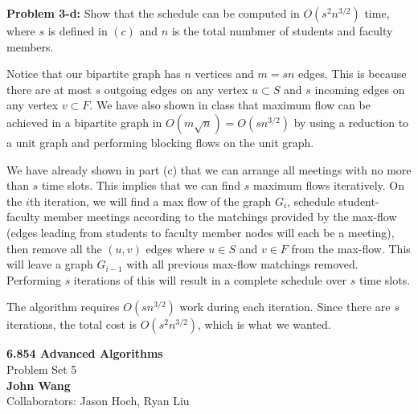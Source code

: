 \documentclass[psamsfonts]{amsart}
\newenvironment{sol}{\vspace{0.25cm}{\large \bfseries Solution:}}{\qedsymbol}
\newenvironment{prob}[1]{\begin{framed}{\large \bfseries Problem #1:}}{\end{framed}}
\newcommand{\makenewtitle}{
    \begin{center}
    {\huge \bfseries 6.854 Advanced Algorithms} \\
    Problem Set 5\\
    \vspace{0.25cm}
    {\bfseries John Wang} \\
    Collaborators: Jason Hoch, Ryan Liu
    \end{center}
    \vspace{0.5cm}
}
\begin{document}
\begin{prob}{3-d}
Show that the schedule can be computed in $O(s^2 n^{3/2})$ time, where $s$ is defined in $(c)$ and $n$ is the total numbmer of students and faculty members.
\end{prob}
\begin{sol}
Notice that our bipartite graph has $n$ vertices and $m = sn$ edges. This is because there are at most $s$ outgoing edges on any vertex $u \subset S$ and $s$ incoming edges on any vertex $v \subset F$. We have also shown in class that maximum flow can be achieved in a bipartite graph in $O(m \sqrt{n}) = O(s n^{3/2})$ by using a reduction to a unit graph and performing blocking flows on the unit graph. 

We have already shown in part (c) that we can arrange all meetings with no more than $s$ time slots. This implies that we can find $s$ maximum flows iteratively. On the $i$th iteration, we will find a max flow of the graph $G_i$, schedule student-faculty member meetings according to the matchings provided by the max-flow (edges leading from students to faculty member nodes will each be a meeting), then remove all the $(u,v)$ edges where $u \in S$ and $v \in F$ from the max-flow. This will leave a graph $G_{i-1}$ with all previous max-flow matchings removed. Performing $s$ iterations of this will result in a complete schedule over $s$ time slots.

The algorithm requires $O(s n^{3/2})$ work during each iteration. Since there are $s$ iterations, the total cost is $O(s^2 n^{3/2})$, which is what we wanted.
\end{sol}

\newpage
\makenewtitle
\end{document}
